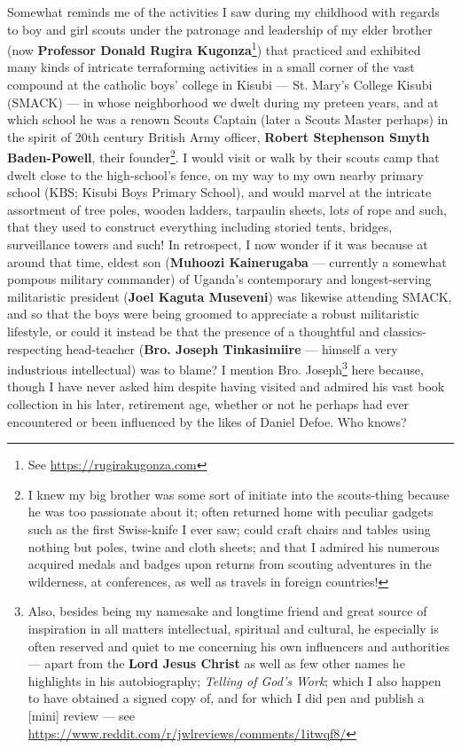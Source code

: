 \documentclass[a4paper]{article}
\begin{document}
Somewhat reminds me of the activities I saw during my childhood with regards to boy and girl scouts under the patronage and leadership of my elder brother (now \textbf{Professor Donald Rugira Kugonza}\footnote{See \url{https://rugirakugonza.com}}) that practiced and exhibited many kinds of intricate terraforming activities in a small corner of the vast compound at the catholic boys' college in Kisubi --- St. Mary's College Kisubi (SMACK) --- in whose neighborhood we dwelt during my preteen years, and at which school he was a renown Scouts Captain (later a Scouts Master perhaps) in the spirit of 20th century British Army officer, \textbf{Robert Stephenson Smyth Baden-Powell}, their founder\footnote{I knew my big brother was some sort of initiate into the scouts-thing because he was too passionate about it; often returned home with peculiar gadgets such as the first Swiss-knife I ever saw; could craft chairs and tables using nothing but poles, twine and cloth sheets; and that I admired his numerous acquired medals and badges upon returns from scouting adventures in the wilderness, at conferences, as well as travels in foreign countries!}. I would visit or walk by their scouts camp that dwelt close to the high-school's fence, on my way to my own nearby primary school (KBS; Kisubi Boys Primary School), and would marvel at the intricate assortment of tree poles, wooden ladders, tarpaulin sheets, lots of rope and such, that they used to construct everything including storied tents, bridges, surveillance towers and such! In retrospect, I now wonder if it was because at around that time, eldest son (\textbf{Muhoozi Kainerugaba} --- currently a somewhat pompous military commander) of Uganda's contemporary and longest-serving militaristic president (\textbf{Joel Kaguta Museveni}) was likewise attending SMACK, and so that the boys were being groomed to appreciate a robust militaristic lifestyle, or could it instead be that the presence of a thoughtful and classics-respecting head-teacher (\textbf{Bro. Joseph Tinkasimiire} --- himself a very industrious intellectual) was to blame? I mention Bro. Joseph\footnote{Also, besides being my namesake and longtime friend and great source of inspiration in all matters intellectual, spiritual and cultural, he especially is often reserved and quiet to me concerning his own influencers and authorities --- apart from the \textbf{Lord Jesus Christ} as well as few other names he highlights in his autobiography; \textit{Telling of God's Work}; which I also happen to have obtained a signed copy of, and for which I did pen and publish a [mini] review --- see \url{https://www.reddit.com/r/jwlreviews/comments/1itwqf8/}} here because, though I have never asked him despite having visited and admired his vast book collection in his later, retirement age, whether or not he perhaps had ever encountered or been influenced by the likes of Daniel Defoe. Who knows?
\end{document}
